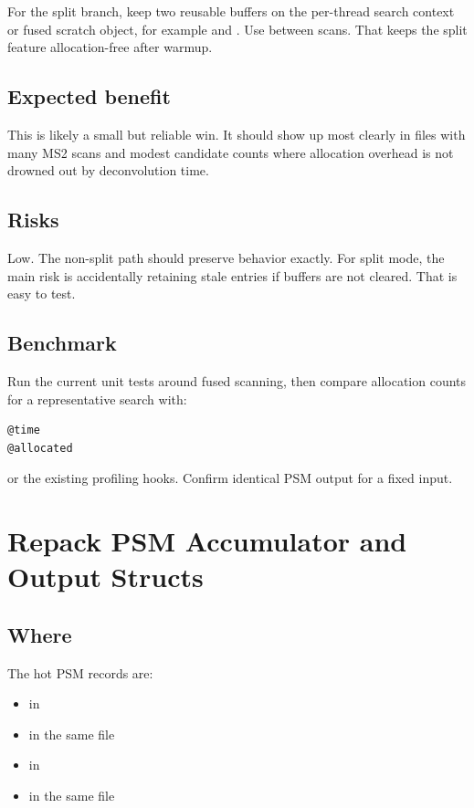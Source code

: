 \documentclass[11pt]{article}
\begin{document}
For the split branch, keep two reusable buffers on the per-thread search context
or fused scratch object, for example  and
. Use  between scans. That keeps the split
feature allocation-free after warmup.

\subsection*{Expected benefit}

This is likely a small but reliable win. It should show up most clearly in
files with many MS2 scans and modest candidate counts where allocation overhead
is not drowned out by deconvolution time.

\subsection*{Risks}

Low. The non-split path should preserve behavior exactly. For split mode, the
main risk is accidentally retaining stale entries if buffers are not cleared.
That is easy to test.

\subsection*{Benchmark}

Run the current unit tests around fused scanning, then compare allocation counts
for a representative search with:

\begin{verbatim}
@time
@allocated
\end{verbatim}

or the existing profiling hooks. Confirm identical PSM output for a fixed input.

\section{Repack PSM Accumulator and Output Structs}

\subsection*{Where}

The hot PSM records are:

\begin{itemize}
  \item {} in 
  \item {} in the same file
  \item {} in 
  \item {} in the same file
\end{itemize}
\end{document}
